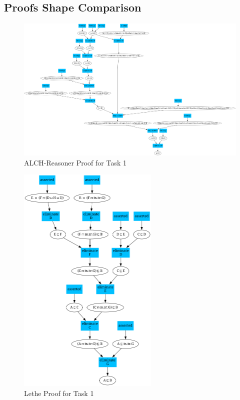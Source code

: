\documentclass[titlepage]{article}
\begin{document}
\subsection{Proofs Shape Comparison}
\begin{figure}
  \centering
  \includegraphics[width=1\textwidth]{pictures/ALCH_task00001.png}
  \caption{ALCH-Reasoner Proof for Task 1}
  \label{fig:t1_Aproof}
\end{figure}


\begin{figure}
  \centering
  \includegraphics[width=0.6\textwidth]{pictures/Lethe_task00001.png}
  \caption{Lethe Proof for Task 1}
  \label{fig:t1_Lproof}
\end{figure}
\end{document}

